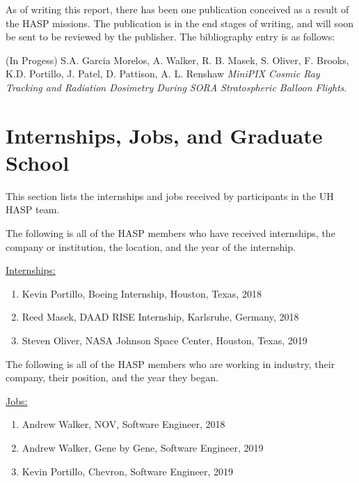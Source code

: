 \begin{appendices}
  \noindent As of writing this report, there has been one publication conceived as a result of the HASP missions.
  The publication is in the end stages of writing, and will soon be sent to be reviewed by the publisher.
  The bibliography entry is as follows:

  \noindent (In Progess) S.A. Garcia Morelos, A. Walker, R. B. Masek, S. Oliver, F. Brooks, K.D. Portillo, J. Patel, D. Pattison, A. L. Renshaw \textit{MiniPIX Cosmic Ray Tracking and Radiation Dosimetry During SORA Stratospheric Balloon Flights}.
  
  \section{Internships, Jobs, and Graduate School}
  \noindent This section lists the internships and jobs received by participants in the UH HASP team.
  
  \vspace{0.5cm}
  
  \noindent The following is all of the HASP members who have received internships, the company or institution, the location, and the year of the internship.
  
  \vspace{0.25cm}
  \noindent\underline{Internships:}
  \begin{enumerate}[leftmargin=3\parindent]
  \item Kevin Portillo, Boeing Internship, Houston, Texas, 2018
  \item Reed Masek, DAAD RISE Internship, Karlsruhe, Germany, 2018
  \item Steven Oliver, NASA Johnson Space Center, Houston, Texas, 2019
  \end{enumerate}

  \vspace{0.5cm}
  
  \noindent The following is all of the HASP members who are working in industry, their company, their position, and the year they began.

  \vspace{0.25cm}
  \noindent\underline{Jobs:}
  \begin{enumerate}[leftmargin=3\parindent]
  \item Andrew Walker, NOV, Software Engineer, 2018
  \item Andrew Walker, Gene by Gene, Software Engineer, 2019
  \item Kevin Portillo, Chevron, Software Engineer, 2019
  \end{enumerate}


\end{appendices}
